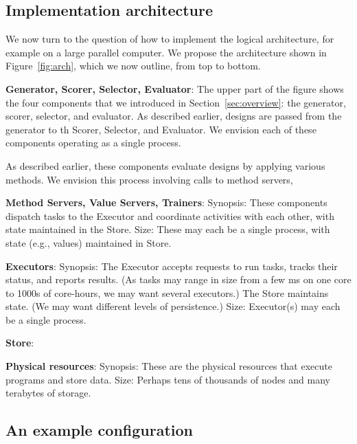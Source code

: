 \documentclass[10pt]{article}
\begin{document}
\subsection{Implementation architecture}

We now turn to the question of how to implement the logical architecture, for example on a large parallel computer. 
We propose the architecture shown in Figure~\ref{fig:arch}, which we now outline, from top to bottom.

\textbf{Generator, Scorer, Selector, Evaluator}: The upper part of the figure shows the four components that we introduced in Section~\ref{sec:overview}:
the generator, scorer, selector, and evaluator. 
As described earlier, designs are passed from the generator to th Scorer, Selector, and Evaluator.
We envision each of these components operating as a single process.

As described earlier, these components evaluate designs by applying various methods. 
We envision this process involving calls to method servers, 



\textbf{Method Servers, Value Servers, Trainers}: 
Synopsis: These components dispatch tasks to the Executor and coordinate activities with each other, with state maintained in the Store.
Size: These may each be a single process, with state (e.g., values) maintained in Store.


\textbf{Executors}:
Synopsis: The Executor accepts requests to run tasks, tracks their status, and reports results. (As tasks may range in size from a few ms on one core to 1000s of core-hours, we may want several executors.) The Store maintains state. (We may want different levels of persistence.)
Size: Executor(s) may each be a single process.

\textbf{Store}: 

\textbf{Physical resources}: 
Synopsis: These are the physical resources that execute programs and store data.
Size: Perhaps tens of thousands of nodes and many terabytes of storage.

\subsection{An example configuration}
\end{document}
